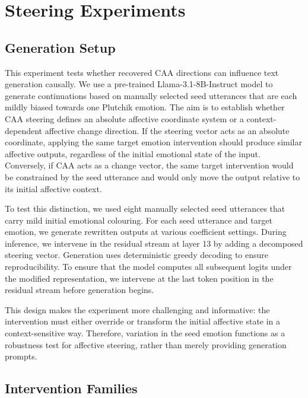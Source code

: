 \section{Steering Experiments}

\subsection*{Generation Setup}

This experiment tests whether recovered CAA directions can influence text generation causally. We use a pre-trained Llama-3.1-8B-Instruct model to generate continuations based on manually selected seed utterances that are each mildly biased towards one Plutchik emotion. The aim is to establish whether CAA steering defines an absolute affective coordinate system or a context-dependent affective change direction. If the steering vector acts as an absolute coordinate, applying the same target emotion intervention should produce similar affective outputs, regardless of the initial emotional state of the input. Conversely, if CAA acts as a change vector, the same target intervention would be constrained by the seed utterance and would only move the output relative to its initial affective context.\par

To test this distinction, we used eight manually selected seed utterances that carry mild initial emotional colouring. For each seed utterance and target emotion, we generate rewritten outputs at various coefficient settings. During inference, we intervene in the residual stream at layer 13 by adding a decomposed steering vector. Generation uses deterministic greedy decoding to ensure reproducibility. To ensure that the model computes all subsequent logits under the modified representation, we intervene at the last token position in the residual stream before generation begins.\par

This design makes the experiment more challenging and informative: the intervention must either override or transform the initial affective state in a context-sensitive way. Therefore, variation in the seed emotion functions as a robustness test for affective steering, rather than merely providing generation prompts.\par


\subsection*{Intervention Families}

